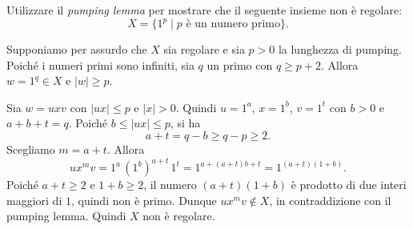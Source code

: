 \newpage

\begin{ex}
Utilizzare il \emph{pumping lemma} per mostrare che il seguente insieme non è regolare:
\[
X=\{1^p\mid p \text{ è un numero primo}\}.
\]
\end{ex}

\begin{sol}
Supponiamo per assurdo che $X$ sia regolare e sia $p>0$ la lunghezza di pumping. Poiché i numeri primi sono infiniti, sia $q$ un primo con $q\ge p+2$. Allora $w=1^q\in X$ e $|w|\ge p$.

Sia $w=uxv$ con $|ux|\le p$ e $|x|>0$. Quindi $u=1^a$, $x=1^b$, $v=1^t$ con $b>0$ e $a+b+t=q$. Poiché $b\le|ux|\le p$, si ha
\[
a+t=q-b\ge q-p\ge 2 .
\]
Scegliamo $m=a+t$. Allora
\[
ux^mv=1^{a}\,(1^{b})^{a+t}\,1^{t}=1^{a+(a+t)b+t}=1^{(a+t)(1+b)} .
\]
Poiché $a+t\ge2$ e $1+b\ge 2$, il numero $(a+t)(1+b)$ è prodotto di due interi maggiori di $1$, quindi non è primo. Dunque $ux^mv\notin X$, in contraddizione con il pumping lemma. Quindi $X$ non è regolare.
\end{sol}
